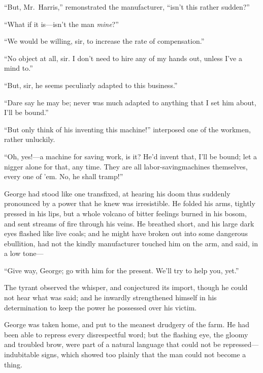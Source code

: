 ``But, Mr.\ Harris,'' remonstrated the manufacturer, ``isn't this rather
sudden?''

``What if it is---isn't the man \emph{mine}?''

``We would be willing, sir, to increase the rate of compensation.''

``No object at all, sir. I don't need to hire any of my hands out, unless I've
a mind to.''

``But, sir, he seems peculiarly adapted to this business.''

``Dare say he may be; never was much adapted to anything that I set him about,
I'll be bound.''

``But only think of his inventing this machine!'' interposed one of the workmen,
rather unluckily.

``Oh, yes!---a machine for saving work, is it? He'd invent that, I'll be bound;
let a nigger alone for that, any time. They are all labor-saving\msc machines
themselves, every one of 'em. No, he shall tramp!''

George had stood like one transfixed, at hearing his doom thus suddenly
pronounced by a power that he knew was irresistible. He folded his arms, tightly
pressed in his lips, but a whole volcano of bitter feelings burned in his bosom,
and sent streams of fire through his veins. He breathed short, and his large
dark eyes flashed like live coals; and he might have broken out into some
dangerous ebullition, had not the kindly manufacturer touched him on the arm,
and said, in a low tone---

``Give way, George; go with him for the present. We'll try to help you, yet.''

The tyrant observed the whisper, and conjectured its import, though he could not
hear what was said; and he inwardly strengthened himself in his determination to
keep the power he possessed over his victim.

George was taken home, and put to the meanest drudgery of the farm. He had been
able to repress every disrespectful word; but the flashing eye, the gloomy and
troubled brow, were part of a natural language that could not be
repressed---indubitable signs, which showed too plainly that the man could not
become a thing.

